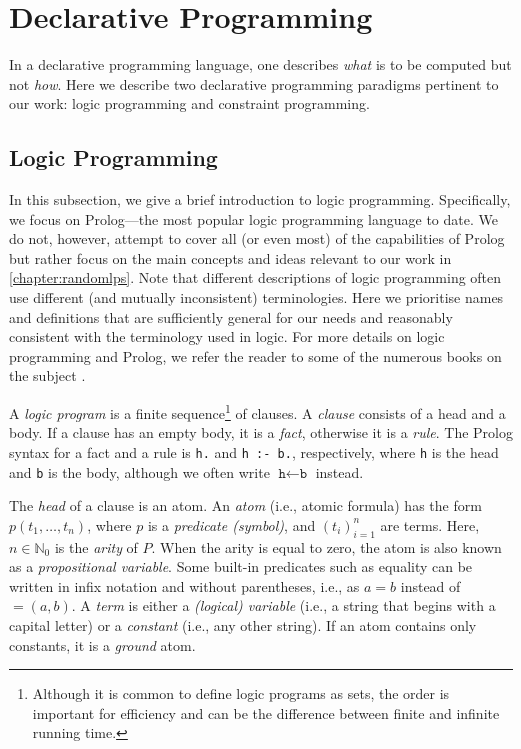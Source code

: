 \section{Declarative Programming}

In a declarative programming language, one describes \emph{what} is to be computed but not \emph{how}. Here we describe two declarative programming paradigms pertinent to our work: logic programming and constraint programming.

\subsection{Logic Programming} \label{sec:lp}

In this subsection, we give a brief introduction to logic programming. Specifically, we focus on Prolog---the most popular logic programming language to date. We do not, however, attempt to cover all (or even most) of the capabilities of Prolog but rather focus on the main concepts and ideas relevant to our work in \cref{chapter:randomlps}. Note that different descriptions of logic programming often use different (and mutually inconsistent) terminologies. Here we prioritise names and definitions that are sufficiently general for our needs and reasonably consistent with the terminology used in logic. For more details on logic programming and Prolog, we refer the reader to some of the numerous books on the subject \citep{DBLP:books/daglib/0041598,DBLP:books/daglib/0067951}.

A \emph{logic program} is a finite sequence\footnote{Although it is common to define logic programs as sets, the order is important for efficiency and can be the difference between finite and infinite running time.} of clauses. A \emph{clause} consists of a head and a body. If a clause has an empty body, it is a \emph{fact}, otherwise it is a \emph{rule}. The Prolog syntax for a fact and a rule is \verb+h.+ and \verb+h :- b.+, respectively, where \texttt{h} is the head and \texttt{b} is the body, although we often write $\texttt{h} \gets \texttt{b}$ instead.

The \emph{head} of a clause is an atom. An \emph{atom} (i.e., atomic formula) has the form $p(t_1, \dots, t_n)$, where $p$ is a \emph{predicate (symbol)}, and $(t_i)_{i=1}^n$ are terms. Here, $n \in \mathbb{N}_0$ is the \emph{arity} of $P$. When the arity is equal to zero, the atom is also known as a \emph{propositional variable}. Some built-in predicates such as equality can be written in infix notation and without parentheses, i.e., as $a = b$ instead of $=(a, b)$. A \emph{term} is either a \emph{(logical) variable} (i.e., a string that begins with a capital letter) or a \emph{constant} (i.e., any other string). If an atom contains only constants, it is a \emph{ground} atom.


